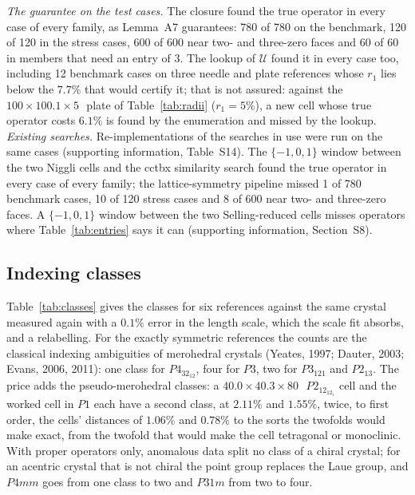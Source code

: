 \emph{The guarantee on the test cases.} The closure found the true operator in every case of every family, as Lemma~A7 guarantees: 780 of 780 on the benchmark, 120 of 120 in the stress cases, 600 of 600 near two- and three-zero faces and 60 of 60 in members that need an entry of $3$. The lookup of $\mathcal U$ found it in every case too, including 12 benchmark cases on three needle and plate references whose $r_1$ lies below the $7.7\%$ that would certify it; that is not assured: against the $100\times100.1\times5$\,\Ang\ plate of Table~\ref{tab:radii} ($r_1=5\%$), a new cell whose true operator costs $6.1\%$ is found by the enumeration and missed by the lookup. \emph{Existing searches.} Re-implementations of the searches in use were run on the same cases (supporting information, Table~S14). The $\{-1,0,1\}$ window between the two Niggli cells and the cctbx similarity search found the true operator in every case of every family; the lattice-symmetry pipeline missed 1 of 780 benchmark cases, 10 of 120 stress cases and 8 of 600 near two- and three-zero faces. A $\{-1,0,1\}$ window between the two Selling-reduced cells misses operators where Table~\ref{tab:entries} says it can (supporting information, Section~S8).

\subsection{Indexing classes}
\label{sec:reindex}
Table~\ref{tab:classes} gives the classes for six references against the same crystal measured again with a $0.1\%$ error in the length scale, which the scale fit absorbs, and a relabelling. For the exactly symmetric references the counts are the classical indexing ambiguities of merohedral crystals (Yeates, 1997; Dauter, 2003; Evans, 2006, 2011): one class for $P4_32_12$, four for $P3$, two for $P3_121$ and $P2_13$. The price adds the pseudo-merohedral classes: a $40.0\times40.3\times80$\,\Ang\ $P2_12_12_1$ cell and the worked cell in $P1$ each have a second class, at $2.11\%$ and $1.55\%$, twice, to first order, the cells\textquoteright{} distances of $1.06\%$ and $0.78\%$ to the sorts the twofolds would make exact, from the twofold that would make the cell tetragonal or monoclinic. With proper operators only, anomalous data split no class of a chiral crystal; for an acentric crystal that is not chiral the point group replaces the Laue group, and $P4mm$ goes from one class to two and $P31m$ from two to four.

